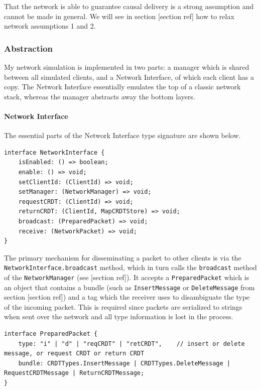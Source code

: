\documentclass[12pt,a4paper,twoside,openright]{report}
\begin{document}
		That the network is able to guarantee causal delivery is a strong assumption and cannot be made in general. We will see in section [section ref] how to relax network assumptions 1 and 2.
		
		\subsubsection{Abstraction}
		My network simulation is implemented in two parts: a manager which is shared between all simulated clients, and a Network Interface, of which each client has a copy. The Network Interface essentially emulates the top of a classic network stack, whereas the manager abstracts away the bottom layers. 

		\paragraph{Network Interface} The essential parts of the Network Interface type signature are shown below.
		
\begin{lstlisting}[caption=NetworkInterface Type Signature (cleaned)]
interface NetworkInterface {
	isEnabled: () => boolean;
	enable: () => void;
	setClientId: (ClientId) => void;
	setManager: (NetworkManager) => void;
	requestCRDT: (ClientId) => void;
	returnCRDT: (ClientId, MapCRDTStore) => void;
	broadcast: (PreparedPacket) => void;
	receive: (NetworkPacket) => void;
}
\end{lstlisting}

		The primary mechanism for disseminating a packet to other clients is via the \lstinline|NetworkInterface.broadcast| method, which in turn calls the \lstinline|broadcast| method of the \lstinline|NetworkManager| (see [section ref]). It accepts a \lstinline|PreparedPacket| which is an object that contains a bundle (such as \lstinline|InsertMessage| or \lstinline|DeleteMessage| from section [section ref]) and a tag which the receiver uses to disambiguate the type of the incoming packet. This is required since packets are serialized to strings when sent over the network and all type information is lost in the process.
\begin{lstlisting}	
interface PreparedPacket {
	type: "i" | "d" | "reqCRDT" | "retCRDT",    // insert or delete message, or request CRDT or return CRDT
	bundle: CRDTTypes.InsertMessage | CRDTTypes.DeleteMessage | RequestCRDTMessage | ReturnCRDTMessage;
}
\end{lstlisting}
		
\end{document}
